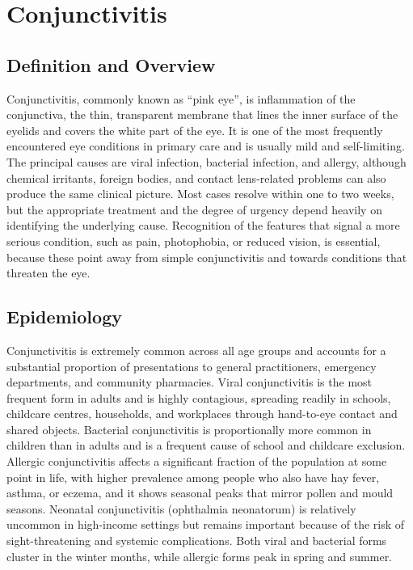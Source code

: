 \chapter{Conjunctivitis}

\section*{Definition and Overview}
Conjunctivitis, commonly known as ``pink eye'', is inflammation of the conjunctiva, the thin, transparent membrane that lines the inner surface of the eyelids and covers the white part of the eye. It is one of the most frequently encountered eye conditions in primary care and is usually mild and self-limiting. The principal causes are viral infection, bacterial infection, and allergy, although chemical irritants, foreign bodies, and contact lens-related problems can also produce the same clinical picture. Most cases resolve within one to two weeks, but the appropriate treatment and the degree of urgency depend heavily on identifying the underlying cause. Recognition of the features that signal a more serious condition, such as pain, photophobia, or reduced vision, is essential, because these point away from simple conjunctivitis and towards conditions that threaten the eye.

\section*{Epidemiology}
Conjunctivitis is extremely common across all age groups and accounts for a substantial proportion of presentations to general practitioners, emergency departments, and community pharmacies. Viral conjunctivitis is the most frequent form in adults and is highly contagious, spreading readily in schools, childcare centres, households, and workplaces through hand-to-eye contact and shared objects. Bacterial conjunctivitis is proportionally more common in children than in adults and is a frequent cause of school and childcare exclusion. Allergic conjunctivitis affects a significant fraction of the population at some point in life, with higher prevalence among people who also have hay fever, asthma, or eczema, and it shows seasonal peaks that mirror pollen and mould seasons. Neonatal conjunctivitis (ophthalmia neonatorum) is relatively uncommon in high-income settings but remains important because of the risk of sight-threatening and systemic complications. Both viral and bacterial forms cluster in the winter months, while allergic forms peak in spring and summer.

